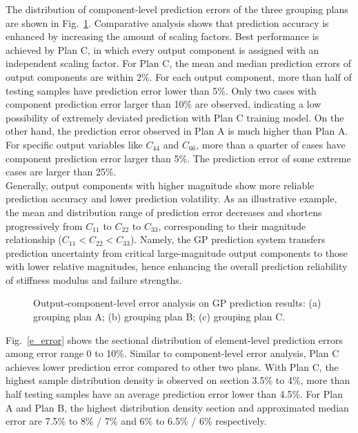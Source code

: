 \documentclass[12pt]{extbook}
\begin{document}
The distribution of component-level prediction errors of the three grouping plans are shown in Fig.~\ref{c_error}. Comparative analysis shows that prediction accuracy is enhanced by increasing the amount of scaling factors. Best performance is achieved by Plan C, in which every output component is assigned with an independent scaling factor. For Plan C, the mean and median prediction errors of output components are within 2\%. For each output component, more than half of testing samples have prediction error lower than 5\%. Only two cases with component prediction error larger than 10\% are observed, indicating a low possibility of extremely deviated prediction with Plan C training model. On the other hand, the prediction error observed in Plan A is much higher than Plan A. For specific output variables like $C_{44}$ and $C_{66}$, more than a quarter of cases have component prediction error larger than 5\%. The prediction error of some extreme cases are larger than 25\%.\\

Generally, output components with higher magnitude show more reliable prediction accuracy and lower prediction volatility. As an illustrative example, the mean and distribution range of prediction error decreases and shortens progressively from $C_{11}$ to $C_{22}$ to $C_{33}$, corresponding to their magnitude relationship ($C_{11} < C_{22} < C_{33}$). Namely, the GP prediction system transfers prediction uncertainty from critical large-magnitude output components to those with lower relative magnitudes, hence enhancing the overall prediction reliability of stiffness modulus and failure strengths.\\

\begin{figure}[htbp]
\centering
{}
\caption{Output-component-level error analysis on GP prediction results: (a) grouping plan A; (b) grouping plan B; (c) grouping plan C.}
\label{c_error}
\end{figure}

Fig.~\ref{e_error} shows the sectional distribution of element-level prediction errors among error range 0 to 10\%. Similar to component-level error analysis, Plan C achieves lower prediction error compared to other two plans. With Plan C, the highest sample distribution density is observed on section 3.5\% to 4\%, more than half testing samples have an average prediction error lower than 4.5\%. For Plan A and Plan B, the highest distribution density section and approximated median error are 7.5\% to 8\% / 7\% and 6\% to 6.5\% / 6\% respectively.\\
\end{document}
